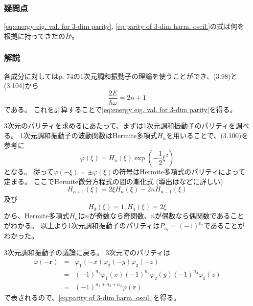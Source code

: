 \documentclass{jsarticle}
\begin{document}
\subsubsection*{疑問点}

\eqref{eq:energy eig. val. for 3-dim parity}, \eqref{eq:parity of 3-dim harm. oscil.}の式は何を根拠に持ってきたのか。

\subsubsection*{解説}

各成分に対してはp. 74の1次元調和振動子の理論を使うことができ、(3.98)と(3.104)から
\begin{equation*}
    \dfrac{2E}{\hbar\omega}=2n+1
\end{equation*}
である。
これを計算することで\eqref{eq:energy eig. val. for 3-dim parity}を得る。

3次元のパリティを求めるにあたって、まずは1次元調和振動子のパリティを調べる。
1次元調和振動子の波動関数はHermite多項式$H_n$を用いることで、(3.100)を参考に
\begin{equation*}
    \varphi(\xi)
    =
    H_n(\xi)\exp\left(-\dfrac{1}{2}\xi^2\right)
\end{equation*}
となる。
従って$\varphi(-\xi)=\pm\varphi(\xi)$の符号はHermite多項式のパリティによって定まる。
ここでHermite微分方程式の間の漸化式 (導出は\cite{recurrence of Hermite}などに詳しい)
\begin{equation*}
    H_{n+1}(\xi)
    =
    2\xi H_n(\xi)
    -
    2nH_{n-1}(\xi)
\end{equation*}
及び
\begin{equation*}
    H_0(\xi)=1, H_1(\xi)=2\xi
\end{equation*}
から、Hermite多項式$H_n$は$n$が奇数なら奇関数、$n$が偶数なら偶関数であることがわかる。
以上より1次元調和振動子のパリティは$P_{n_i}=(-1)^{n_i}$であることがわかった。

3次元調和振動子の議論に戻る。
3次元でのパリティは
\begin{equation*}
    \begin{array}{rcl}
        \varphi(-\bm{r})
        &=&
        \varphi_1(-x)\varphi_2(-y)\varphi_3(-z)
        \\
        &=&
        (-1)^{n_1}\varphi_1(x)(-1)^{n_2}\varphi_2(y)(-1)^{n_3}\varphi_3(z)
        \\
        &=&
        (-1)^{n_1+n_2+n_3}\varphi(\bm{r})
    \end{array}
\end{equation*}
で表されるので、\eqref{eq:parity of 3-dim harm. oscil.}を得る。
\end{document}
